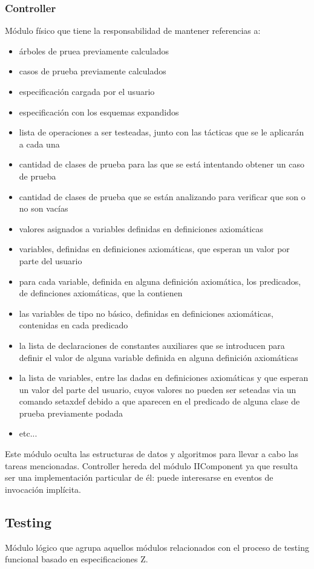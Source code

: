 \documentclass[a4paper,10pt]{report}
\begin{document}
			\subsubsection{Controller}
			Módulo físico que tiene la responsabilidad de mantener referencias a:
			\begin{itemize}
			 \item árboles de pruea previamente calculados
			 \item casos de prueba previamente calculados
 			 \item especificación cargada por el usuario
			 \item especificación con los esquemas expandidos
			 \item lista de operaciones a ser testeadas, junto con las tácticas que se le aplicarán a cada una
			 \item cantidad de clases de prueba para las que se está intentando obtener un caso de prueba
			 \item cantidad de clases de prueba que se están analizando para verificar que son o no son vacías
			 \item valores asignados a variables definidas en definiciones axiomáticas
			 \item variables, definidas en definiciones axiomáticas, que esperan un valor por parte del usuario
			 \item para cada variable, definida en alguna definición axiomática, los predicados, de definciones axiomáticas, que la contienen
			 \item las variables de tipo no básico, definidas en definiciones axiomáticas, contenidas en cada predicado
			 \item la lista de declaraciones de constantes auxiliares que se introducen para definir el valor de alguna variable definida en alguna definición axiomáticas
			 \item la lista de variables, entre las dadas en definiciones axiomáticas y que esperan un valor del parte del usuario, cuyos valores no pueden ser seteadas via un comando setaxdef debido a que aparecen en el predicado de alguna clase de prueba previamente podada
			 \item etc...
			\end{itemize}
			Este módulo oculta las estructuras de datos y algoritmos para llevar a cabo las tareas mencionadas. Controller hereda del módulo IIComponent ya que resulta ser una implementación particular de él: puede interesarse en eventos de invocación implícita.
		\subsection{Testing}
		Módulo lógico que agrupa aquellos módulos relacionados con el proceso de testing funcional basado en especificaciones Z.
\end{document}
